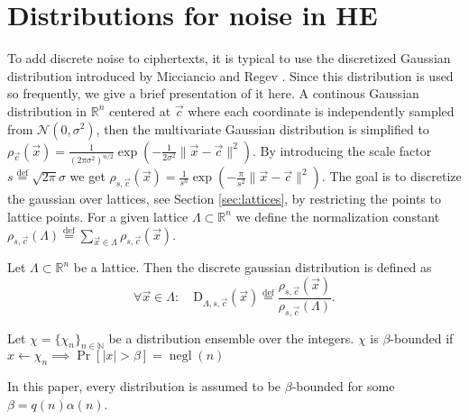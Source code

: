 \section{Distributions for noise in HE}
To add discrete noise to ciphertexts, it is typical to use the discretized Gaussian distribution introduced by Micciancio and Regev \cite{disc-gauss}. Since this distribution is used so frequently, we give a brief presentation of it here. A continous Gaussian distribution in $\mathbb{R}^n$ centered at $\vec{c}$ where each coordinate is independently sampled from $\mathcal{N}(0, \sigma^2)$, then the multivariate Gaussian distribution is simplified to $\rho_{\vec{c}}(\vec{x})=\frac{1}{\left(2 \pi \sigma^2\right)^{n / 2}} \exp \left(-\frac{1}{2 \sigma^2} \| \vec{x}-\vec{c} \| ^2\right)$. By introducing the scale factor $s \stackrel{\mathrm{def}}{=} \sqrt{2\pi}\sigma$ we get $\rho_{s, \vec{c}}(\vec{x})=\frac{1}{s^n} \exp \left(-\frac{\pi}{s^2} \| \vec{x}-\vec{c} \| ^2\right)$.
The goal is to discretize the gaussian over lattices, see Section \ref{sec:lattices}, by restricting the points to lattice points. For a given lattice $\Lambda \subset \mathbb{R}^n$ we define the normalization constant $\rho_{s, \vec{c}}(\Lambda) \stackrel{\mathrm{def}}{=} \sum_{\vec{x} \in \Lambda} \rho_{s, \vec{c}}(\vec{x})$.
\begin{definition}\label{Disc-Gauss}
    Let $\Lambda \subset \mathbb{R}^n$ be a lattice. Then the discrete gaussian distribution is defined as
    \begin{equation*}
        \forall \vec{x} \in \Lambda \colon \quad \textrm{D}_{\Lambda, s, \vec{c}}(\vec{x}) \stackrel{\mathrm{def}}{=} \frac{\rho_{s, \vec{c}}(\vec{x})}{\rho_{s, \vec{c}}(\Lambda)}.
    \end{equation*}            
\end{definition}
\begin{definition}
    Let $\chi = \{\chi_n\}_{n\in \mathbb{N}}$ be a distribution ensemble over the integers. $\chi$ is $\beta$-bounded if $x \leftarrow \chi_n \implies \operatorname{Pr}[|x|>\beta] = \operatorname{negl}(n)$
\end{definition}
In this paper, every distribution is assumed to be $\beta$-bounded for some $\beta = q(n)\alpha(n)$.



